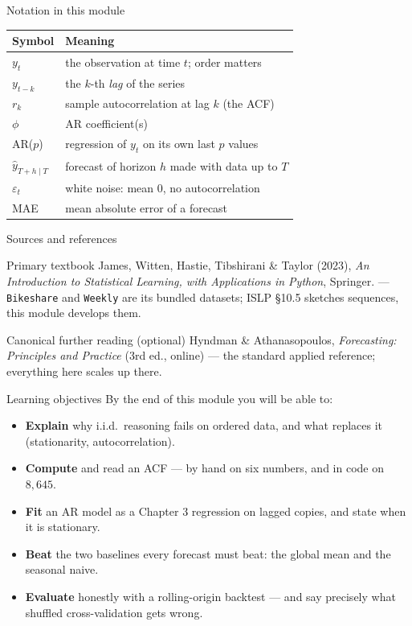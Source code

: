 \documentclass[aspectratio=169,11pt]{beamer}
\begin{document}
\begin{frame}{Notation in this module}
  \footnotesize
  \begin{center}
  \begin{tabular}{@{}ll@{}}
    \toprule
    \textbf{Symbol} & \textbf{Meaning} \\
    \midrule
    $y_t$ & the observation at time $t$; order matters \\
    $y_{t-k}$ & the $k$-th \emph{lag} of the series \\
    $r_k$ & sample autocorrelation at lag $k$ (the ACF) \\
    $\phi$ & AR coefficient(s) \\
    AR($p$) & regression of $y_t$ on its own last $p$ values \\
    $\hat y_{T+h\mid T}$ & forecast of horizon $h$ made with data up to $T$ \\
    $\varepsilon_t$ & white noise: mean $0$, no autocorrelation \\
    MAE & mean absolute error of a forecast \\
    \bottomrule
  \end{tabular}
  \end{center}
\end{frame}

\begin{frame}{Sources and references}
  \begin{block}{Primary textbook}
    James, Witten, Hastie, Tibshirani \& Taylor (2023),
    \emph{An Introduction to Statistical Learning, with Applications in Python},
    Springer. --- \texttt{Bikeshare} and \texttt{Weekly} are its bundled datasets;
    ISLP \S 10.5 sketches sequences, this module develops them.
  \end{block}
  \begin{block}{Canonical further reading (optional)}
    Hyndman \& Athanasopoulos, \emph{Forecasting: Principles and Practice} (3rd ed.,
    online) --- the standard applied reference; everything here scales up there.
  \end{block}
\end{frame}

\begin{frame}{Learning objectives}
  By the end of this module you will be able to:
  \begin{itemize}
    \item \textbf{Explain} why i.i.d.\ reasoning fails on ordered data, and what
          replaces it (stationarity, autocorrelation).
    \item \textbf{Compute} and read an ACF --- by hand on six numbers, and in code
          on $8{,}645$.
    \item \textbf{Fit} an AR model as a Chapter 3 regression on lagged copies, and
          state when it is stationary.
    \item \textbf{Beat} the two baselines every forecast must beat: the global mean
          and the seasonal naive.
    \item \textbf{Evaluate} honestly with a rolling-origin backtest --- and say
          precisely what shuffled cross-validation gets wrong.
  \end{itemize}
\end{frame}
\end{document}
